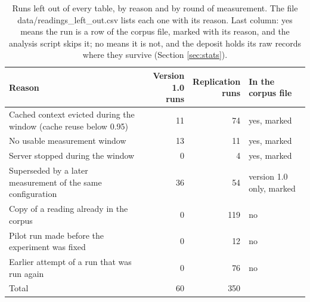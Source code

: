\begin{table}[t]
\centering
\scriptsize
\setlength{\tabcolsep}{3pt}
\caption{Runs left out of every table, by reason and by round of measurement. The file data/readings\_left\_out.csv lists each one with its reason. Last column: yes means the run is a row of the corpus file, marked with its reason, and the analysis script skips it; no means it is not, and the deposit holds its raw records where they survive (Section \ref{sec:stats}).}\label{tab:left_out}
\begin{tabular}{lrrl}
\toprule
Reason & \makecell[r]{Version 1.0\\runs} & \makecell[r]{Replication\\runs} & \makecell[l]{In the\\corpus file} \\
\midrule
Cached context evicted during the window (cache reuse below 0.95) & 11 & 74 & yes, marked \\
No usable measurement window & 13 & 11 & yes, marked \\
Server stopped during the window & 0 & 4 & yes, marked \\
Superseded by a later measurement of the same configuration & 36 & 54 & version 1.0 only, marked \\
Copy of a reading already in the corpus & 0 & 119 & no \\
Pilot run made before the experiment was fixed & 0 & 12 & no \\
Earlier attempt of a run that was run again & 0 & 76 & no \\
Total & 60 & 350 &  \\
\bottomrule
\end{tabular}
\end{table}
